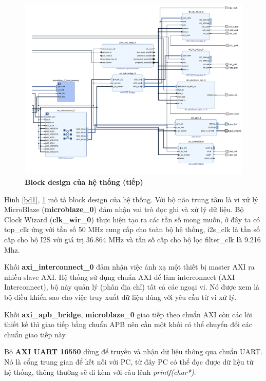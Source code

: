 \begin{figure}[H]
    \centering
    \includegraphics[width=15cm]{Images/Chuong5/fpga/block_design_2.png}
    \caption[Block design của hệ thống (tiếp)]{\bfseries \fontsize{12pt}{0pt}\selectfont Block design của hệ thống (tiếp)}
    \label{bd2}
\end{figure}
Hình \ref{bd1}, \ref{bd2} mô tả block design của hệ thống. Với bộ não trung tâm là vi xử lý MicroBlaze (\textbf{microblaze\_0}) đảm nhận vai trò đọc ghi và xử lý dữ liệu. Bộ Clock Wizard (\textbf{clk\_wir\_0}) thực hiện tạo ra các tần số mong muốn, ở đây ta có top\_clk ứng với tần số 50 MHz cung cấp cho toàn bộ hệ thống, i2s\_clk là tần số cấp cho bộ I2S với giá trị 36.864 MHz và tần số cấp cho bộ lọc filter\_clk là 9.216 Mhz.

 Khối \textbf{axi\_interconnect\_0} đảm nhận việc ánh xạ một thiết bị master AXI ra nhiều slave AXI. Hệ thống sử dụng chuẩn AXI để làm interconnect (AXI Interconnect), bộ này quản lý (phân địa chỉ) tất cả các ngoại vi. Nó được xem là bộ điều khiển sao cho việc truy xuất dữ liệu đúng với yêu cầu từ vi xử lý.

Khối \textbf{axi\_apb\_bridge}, \textbf{microblaze\_0} giao tiếp theo chuẩn AXI còn các lõi 
thiết kế thì giao tiếp bằng chuẩn APB nên cần một khối có thể chuyển đổi các chuẩn 
giao tiếp này


Bộ \textbf{AXI UART 16550} dùng để truyền và nhận dữ liệu thông qua chuẩn UART. Nó là cổng trung gian để kết nối với PC, từ đây PC có thể đọc được dữ liệu từ hệ thống, thông thường sẽ đi kèm với câu lênh \textit{printf(char*)}.

